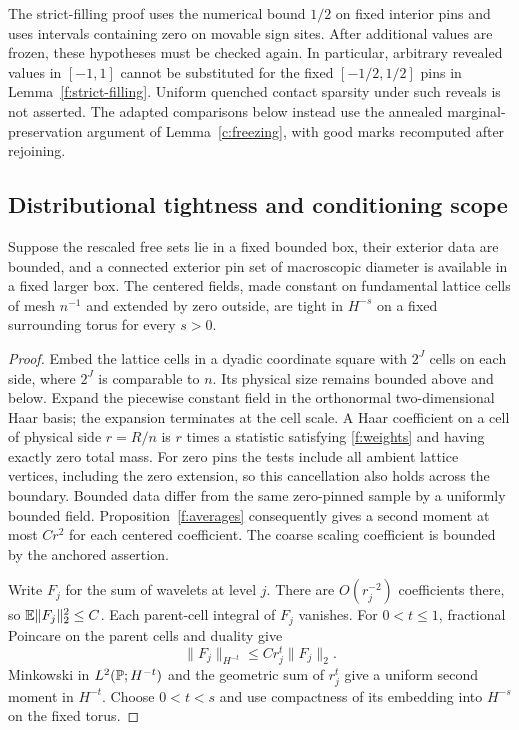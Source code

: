 \begin{remark}\label{f:reveal-obligation}
The strict-filling proof uses the numerical
bound $1/2$ on fixed interior pins and uses intervals containing zero on
movable sign sites. After additional values are frozen, these hypotheses
must be checked again. In particular, arbitrary revealed values in
$[-1,1]$ cannot be substituted for the fixed $[-1/2,1/2]$ pins in
Lemma~\ref{f:strict-filling}. Uniform quenched contact sparsity under
such reveals is not asserted. The adapted comparisons below instead
use the annealed marginal-preservation argument of
Lemma~\ref{c:freezing}, with good marks recomputed after rejoining.
\end{remark}

\subsection{Distributional tightness and conditioning scope}
\begin{corollary}\label{f:tightness}
Suppose the rescaled free sets lie in a fixed bounded box, their exterior
data are bounded, and a connected exterior pin set of macroscopic diameter
is available in a fixed larger box. The centered fields, made constant on
fundamental lattice cells of mesh $n^{-1}$ and extended by zero outside,
are tight in $H^{-s}$ on a fixed surrounding torus for every $s>0$.
\end{corollary}
\begin{proof}
Embed the lattice cells in a dyadic coordinate square with $2^J$ cells
on each side, where $2^J$ is comparable to $n$. Its physical size remains
bounded above and below. Expand the piecewise constant field in the
orthonormal two-dimensional Haar basis; the expansion terminates at the
cell scale. A Haar coefficient on a cell of physical side $r=R/n$ is
$r$ times a statistic satisfying \eqref{f:weights} and having exactly
zero total mass. For zero pins the tests include all ambient lattice
vertices, including the zero extension, so this cancellation also holds
across the boundary. Bounded data differ from the same zero-pinned sample
by a uniformly bounded field. Proposition~\ref{f:averages} consequently
gives a second moment at most $Cr^2$ for each centered coefficient.
The coarse scaling coefficient is bounded by the anchored assertion.

Write $F_j$ for the sum of wavelets at level $j$. There are $O(r_j^{-2})$
coefficients there, so $\mathbb E\|F_j\|_2^2\le C$. Each parent-cell integral
of $F_j$ vanishes. For $0<t\le1$, fractional Poincare on the parent cells
and duality give
\[
 \|F_j\|_{H^{-t}}\le Cr_j^t\|F_j\|_2.
\]
Minkowski in $L^2(\mathbb P;H^{-t})$ and the geometric sum of $r_j^t$ give
a uniform second moment in $H^{-t}$. Choose $0<t<s$ and use compactness
of its embedding into $H^{-s}$ on the fixed torus.
\end{proof}

